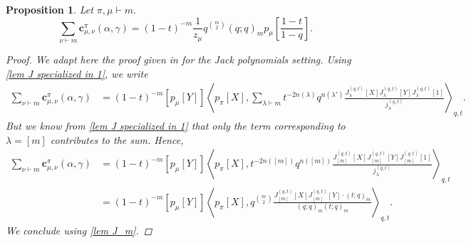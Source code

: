 \documentclass[12pt]{amsart}
\newtheorem{prop}[thm]{Proposition}
\theoremstyle{remark}
\newcommand{\bfc}{\boldsymbol{c}}
\newcommand{\J}{{J}^{(q,t)}}
\newcommand{\normJ}{{j}^{(q,t)}}
\begin{document}
\begin{prop}\label{prop marginal sums}
Let $\pi,\mu\vdash m.$
    $$\sum_{\nu\vdash m}\bfc^\pi_{\mu,\nu}(\alpha,\gamma)=(1-t)^{-m}\frac{1}{z_\mu}q^{\binom{m}{2}}(q;q)_m p_\mu\left[\frac{1-t}{1-q}\right].$$
    \begin{proof}
    We adapt here the proof given in \cite{GouldenJackson1996} for the Jack polynomials setting. Using \cref{lem J specialized in 1}, we write
    \begin{align*}
  \sum_{\nu\vdash m} \bfc^\pi_{\mu,\nu}(\alpha,\gamma)
  &=(1-t)^{-m}[p_\mu[Y]]\left\langle p_\pi[X],\sum_{\lambda\vdash m}t^{-2n(\lambda)}q^{n(\lambda')}\frac{\J_\lambda[X]\J_\lambda[Y]\J_\lambda[1]}{\normJ_\lambda}\right\rangle_{q,t}.
  \end{align*}
    But we know from \cref{lem J specialized in 1} that only the term corresponding to $\lambda=[m]$ contributes to the sum. Hence,
  \begin{align*}
  \sum_{\nu\vdash m} \bfc^\pi_{\mu,\nu}(\alpha,\gamma)&=(1-t)^{-m}[p_\mu[Y]]\left\langle p_\pi[X],t^{-2n([m])}q^{n([m])}\frac{\J_{[m]}[X]\J_{[m]}[Y]\J_{[m]}[1]}{\normJ_\lambda}\right\rangle_{q,t}\\
  &=(1-t)^{-m}[p_\mu[Y]]\left\langle p_\pi[X],q^{\binom{m}{2}}\frac{\J_{[m]}[X]\J_{[m]}[Y]\cdot(t;q)_m}{(q;q)_m(t;q)_m}\right\rangle_{q,t}.
    \end{align*}
We conclude using \cref{lem J_m}.
    \end{proof}
\end{prop}
\end{document}
